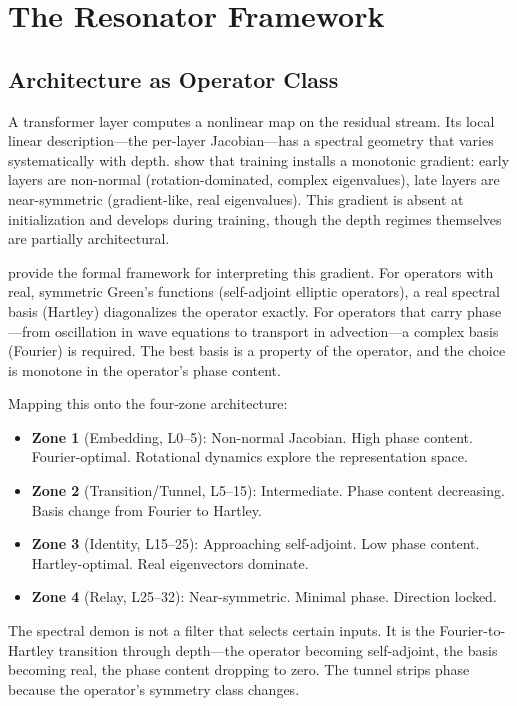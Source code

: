 \documentclass[12pt]{article}
\begin{document}
\section{The Resonator Framework}
\label{sec:resonator}

\subsection{Architecture as Operator Class}

A transformer layer computes a nonlinear map on the residual stream. Its local linear description---the per-layer Jacobian---has a spectral geometry that varies systematically with depth. \citet{guitchounts2025} show that training installs a monotonic gradient: early layers are non-normal (rotation-dominated, complex eigenvalues), late layers are near-symmetric (gradient-like, real eigenvalues). This gradient is absent at initialization and develops during training, though the depth regimes themselves are partially architectural.

\citet{sulskis2025} provide the formal framework for interpreting this gradient. For operators with real, symmetric Green's functions (self-adjoint elliptic operators), a real spectral basis (Hartley) diagonalizes the operator exactly. For operators that carry phase---from oscillation in wave equations to transport in advection---a complex basis (Fourier) is required. The best basis is a property of the operator, and the choice is monotone in the operator's phase content.

Mapping this onto the four-zone architecture:

\begin{itemize}
\item \textbf{Zone 1} (Embedding, L0--5): Non-normal Jacobian. High phase content. Fourier-optimal. Rotational dynamics explore the representation space.
\item \textbf{Zone 2} (Transition/Tunnel, L5--15): Intermediate. Phase content decreasing. Basis change from Fourier to Hartley.
\item \textbf{Zone 3} (Identity, L15--25): Approaching self-adjoint. Low phase content. Hartley-optimal. Real eigenvectors dominate.
\item \textbf{Zone 4} (Relay, L25--32): Near-symmetric. Minimal phase. Direction locked.
\end{itemize}

The spectral demon is not a filter that selects certain inputs. It is the Fourier-to-Hartley transition through depth---the operator becoming self-adjoint, the basis becoming real, the phase content dropping to zero. The tunnel strips phase because the operator's symmetry class changes.
\end{document}
